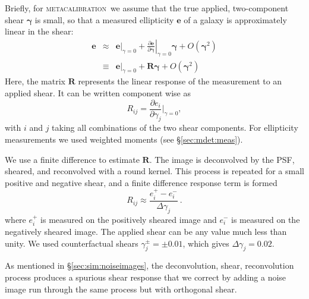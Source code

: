 \documentclass[twocolumn,twocolappendix,astrosym]{openjournal}
\newcommand{\mcal}{\textsc{metacalibration}}
\begin{document}
Briefly, for \mcal\ we assume that the true applied, two-component shear
$\boldsymbol{\gamma}$ is small, so that a measured ellipticity $\boldsymbol{e}$
of a galaxy is approximately linear in the shear:
\begin{eqnarray} \label{eq:response}
\boldsymbol{e} & \approx & \left.\boldsymbol{e}\right|_{\gamma=0} +
                           \left.\frac{\partial \boldsymbol{e}}{\partial\boldsymbol\gamma}\right|_{\gamma=0} \boldsymbol\gamma +
                           O(\boldsymbol\gamma^2)\nonumber\\
               & \equiv  & \left.\boldsymbol{e}\right|_{\gamma=0} +
                           \boldsymbol{R} \boldsymbol\gamma +
                           O(\boldsymbol\gamma^2)
\end{eqnarray}
Here, the matrix $\boldsymbol{R}$ represents the linear response of the
measurement to an applied shear. It can be written component wise as
\begin{equation}
R_{ij} = \frac{\partial e_i }{\partial \gamma_j } \biggr\rvert_{\gamma=0},
\end{equation}
with $i$ and $j$ taking all combinations of the two shear components.  For ellipticity
measurements we used weighted moments (see \S \ref{sec:mdet:meas}).

We use a finite difference to estimate $\boldsymbol{R}$.  The image is
deconvolved by the PSF, sheared, and reconvolved with a round kernel.  This
process is repeated for a small positive and negative shear, and a finite
difference response term is formed
\begin{equation}
R_{ij} \approx \frac{e_i^{+} - e_i^{-}}{\Delta\gamma_j}\ .
\end{equation}
where $e_i^{+}$ is measured on the positively sheared image and $e_i^{-}$ is
measured on the negatively sheared image.  The applied
shear can be any value much less than unity. We used counterfactual
shears $\gamma_j^{\pm} = \pm0.01$,
which gives $\Delta\gamma_j = 0.02$.

As mentioned in \S \ref{sec:sim:noiseimages}, the deconvolution, shear,
reconvolution process produces a spurious shear response that we correct by
adding a noise image run through the same process but with orthogonal shear.
\end{document}
